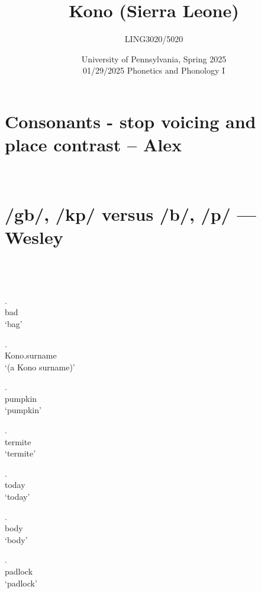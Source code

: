 \documentclass{assets/fieldnotes}
\title{Kono (Sierra Leone)}
\author{LING3020/5020}
\date{University of Pennsylvania, Spring 2025\\01/29/2025 Phonetics and Phonology I }
\begin{document}
\maketitle
\tableofcontents

\newpage 



\section{Consonants - stop voicing and place contrast -- Alex}
\\


\section{/gb/, /kp/  versus /b/, /p/ --- Wesley}

\\
\\
\\

\exg. \\
bad\\
`bag'

\exg. \\
Kono.surname\\
`(a Kono surname)'

\exg. \\
pumpkin\\
`pumpkin'

\exg. \\
termite\\
`termite'

\exg. \\
today\\
`today'

\exg. \\
body\\
`body'

\exg. \\
padlock\\
`padlock'
\end{document}
